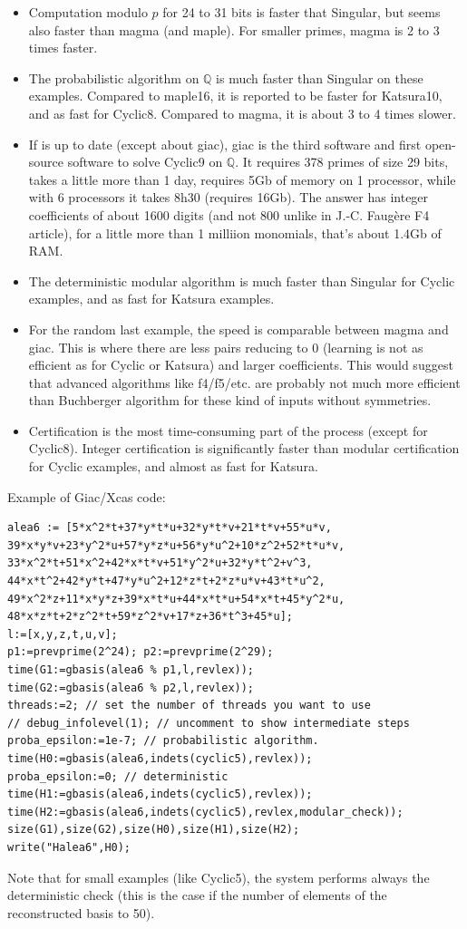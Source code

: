 \documentclass[a4paper,11pt]{article}
\newcommand{\Q}{{\mathbb{Q}}}
\begin{document}
\begin{itemize}
\item Computation modulo $p$ for 24 to 31 bits is faster that Singular, but seems also
  faster than magma (and maple). For smaller primes, magma is 2 to 3
  times faster.
\item The probabilistic algorithm on $\Q$ is much faster than Singular on these examples.
Compared to maple16, it is reported to be faster for Katsura10, 
and as fast for Cyclic8. Compared to magma, it is about 3 to 4
times slower. 
\item If \cite{magma} is up to date (except about giac), giac is the third software and first
  open-source software to solve Cyclic9 on $\Q$. It requires 378
  primes of size 29 bits, takes a little more than 1 day, requires 5Gb
  of memory on 1 processor, while with 6 processors it takes
8h30 (requires 16Gb). The answer has integer coefficients of about 1600 digits
(and not 800 unlike in J.-C. Faug\`ere F4 article), for a little
more than 1 milliion monomials, that's about 1.4Gb of RAM.
\item The deterministic modular algorithm is much faster than Singular for Cyclic examples,
and as fast for Katsura examples. 
\item For the random last example, the speed is comparable between
  magma and giac. This is where there are less pairs reducing to
  0 (learning is not as efficient as for Cyclic or Katsura) and larger
  coefficients. This would suggest that advanced algorithms 
like f4/f5/etc. are probably
not much more efficient than Buchberger algorithm for these kind
of inputs without symmetries.
\item Certification is the most time-consuming part of the process (except
for Cyclic8). Integer certification is significantly faster than modular certification
for Cyclic examples, and almost as fast for Katsura.
\end{itemize}

Example of Giac/Xcas code:
\begin{verbatim}
alea6 := [5*x^2*t+37*y*t*u+32*y*t*v+21*t*v+55*u*v,
39*x*y*v+23*y^2*u+57*y*z*u+56*y*u^2+10*z^2+52*t*u*v,
33*x^2*t+51*x^2+42*x*t*v+51*y^2*u+32*y*t^2+v^3,
44*x*t^2+42*y*t+47*y*u^2+12*z*t+2*z*u*v+43*t*u^2,
49*x^2*z+11*x*y*z+39*x*t*u+44*x*t*u+54*x*t+45*y^2*u,
48*x*z*t+2*z^2*t+59*z^2*v+17*z+36*t^3+45*u];
l:=[x,y,z,t,u,v];
p1:=prevprime(2^24); p2:=prevprime(2^29);
time(G1:=gbasis(alea6 % p1,l,revlex));
time(G2:=gbasis(alea6 % p2,l,revlex));
threads:=2; // set the number of threads you want to use
// debug_infolevel(1); // uncomment to show intermediate steps
proba_epsilon:=1e-7; // probabilistic algorithm.
time(H0:=gbasis(alea6,indets(cyclic5),revlex));
proba_epsilon:=0; // deterministic
time(H1:=gbasis(alea6,indets(cyclic5),revlex));
time(H2:=gbasis(alea6,indets(cyclic5),revlex,modular_check));
size(G1),size(G2),size(H0),size(H1),size(H2);
write("Halea6",H0);
\end{verbatim}
Note that for small examples (like Cyclic5), the system performs always the deterministic
check (this is the case if the number of elements of the reconstructed basis
to 50).
\end{document}
